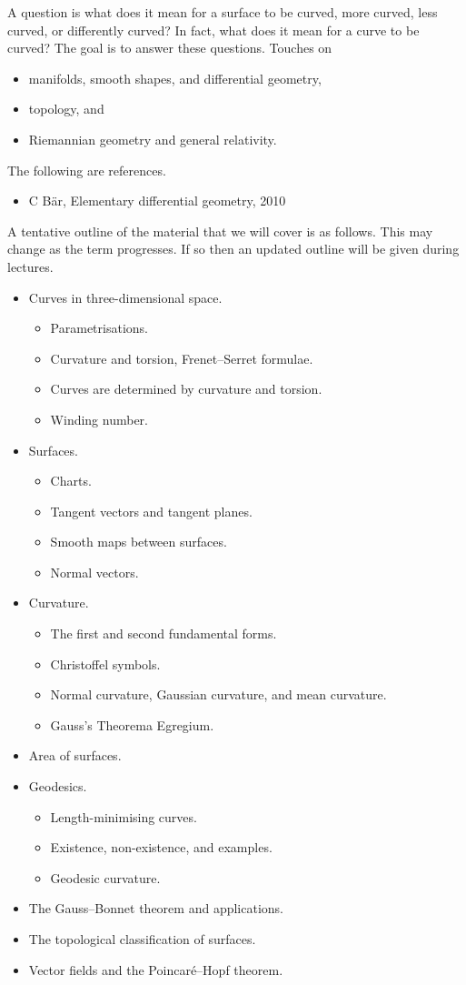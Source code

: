 A question is what does it mean for a surface to be curved, more curved, less curved, or differently curved? In fact, what does it mean for a curve to be curved? The goal is to answer these questions. Touches on
\begin{itemize}
\item manifolds, smooth shapes, and differential geometry,
\item topology, and
\item Riemannian geometry and general relativity.
\end{itemize}
The following are references.
\begin{itemize}
\item C B\"ar, Elementary differential geometry, 2010
\end{itemize}
A tentative outline of the material that we will cover is as follows. This may change as the term progresses. If so then an updated outline will be given during lectures.
\begin{itemize}
\item Curves in three-dimensional space.
\begin{itemize}
\item Parametrisations.
\item Curvature and torsion, Frenet–Serret formulae.
\item Curves are determined by curvature and torsion.
\item Winding number.
\end{itemize}
\item Surfaces.
\begin{itemize}
\item Charts.
\item Tangent vectors and tangent planes.
\item Smooth maps between surfaces.
\item Normal vectors.
\end{itemize}
\item Curvature.
\begin{itemize}
\item The first and second fundamental forms.
\item Christoffel symbols.
\item Normal curvature, Gaussian curvature, and mean curvature.
\item Gauss's Theorema Egregium.
\end{itemize}
\item Area of surfaces.
\item Geodesics.
\begin{itemize}
\item Length-minimising curves.
\item Existence, non-existence, and examples.
\item Geodesic curvature.
\end{itemize}
\item The Gauss–Bonnet theorem and applications.
\item The topological classification of surfaces.
\item Vector fields and the Poincar\'e–Hopf theorem.
\end{itemize}


